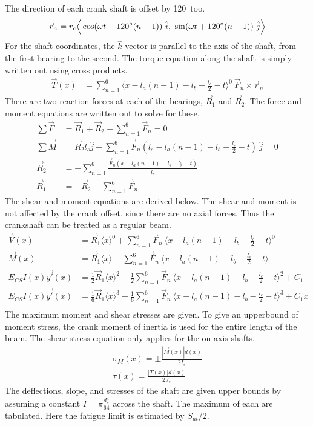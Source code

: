 \documentclass[10pt,a4paper]{article}
\begin{document}
The direction of each crank shaft is offset by 120\degree\ too.
\begin{align*}
	\vec{r}_n = r_c \Big \langle \cos (\omega t + 120 \degree (n-1)  )\ \hat{i},\ \sin (\omega t + 120 \degree (n-1))\ \hat{j}  \Big \rangle
\end{align*}
For the shaft coordinates, the $\hat{k}$ vector is parallel to the axis of the shaft, from the first bearing to the second. The torque equation along the shaft is simply written out using cross products.
\begin{align*}
	\vec{T}(x) &= \sum_{n=1}^6 \langle x - l_a (n-1) - l_b - \frac{l_c}{2} - t\rangle^0\ \vec{F}_n \times \vec{r}_n 
\end{align*}
There are two reaction forces at each of the bearings, $\vec{R}_1$ and $\vec{R}_2$. The force and moment equations are written out to solve for these.
\begin{align*}
	\sum \vec{F} &= \vec{R}_1 + \vec{R}_2 + \sum_{n=1}^6 \vec{F}_n = 0 \\
	\sum \vec{M} &= \vec{R}_2 l_s \hat{j} + \sum_{n=1}^6 \vec{F}_n  ( l_s - l_a (n-1) - l_b - \frac{l_c}{2} - t)\ \hat{j} = 0\\
	\vec{R}_2 &= - \sum_{n=1}^6 \frac{\vec{F}_n ( x - l_a (n-1) - l_b - \frac{l_c}{2} - t)}{l_s}\\
	\vec{R}_1 &= -\vec{R}_2 - \sum_{n=1}^6 \vec{F}_n
\end{align*}
The shear and moment equations are derived below. The shear and moment is not affected by the crank offset, since there are no axial forces. Thus the crankshaft can be treated as a regular beam.
\begin{align*}
	\vec{V}(x) &= \vec{R}_1 \langle x \rangle^0 + \sum_{n=1}^6 \vec{F}_n\ \langle x - l_a (n-1) - l_b - \frac{l_c}{2} - t\rangle^0\\
	\vec{M}(x) &= \vec{R}_1 \langle x \rangle + \sum_{n=1}^6 \vec{F}_n\ \langle x - l_a (n-1) - l_b - \frac{l_c}{2} - t\rangle\\
	E_{CS} I (x) \vec{y'}(x) &= \frac{1}{2}\vec{R}_1 \langle x \rangle^2 + \frac{1}{2}\sum_{n=1}^6 \vec{F}_n\ \langle x - l_a (n-1) - l_b - \frac{l_c}{2} - t\rangle^2 + C_1\\
	E_{CS} I (x) \vec{y'}(x) &= \frac{1}{6}\vec{R}_1 \langle x \rangle^3 + \frac{1}{6}\sum_{n=1}^6 \vec{F}_n\ \langle x - l_a (n-1) - l_b - \frac{l_c}{2} - t\rangle^3 + C_1 x\\
\end{align*}
The maximum moment and shear stresses are given. To give an upperbound of moment stress, the crank moment of inertia is used for the entire length of the beam. The shear stress equation only applies for the on axis shafts.
\begin{align*}
	\sigma_M (x) = \pm \frac{|\vec{M}(x)| d(x)}{2 I_s}\\
	\tau (x) = \frac{|T(x)| d (x)}{2 J_s}
\end{align*}
The deflections, slope, and stresses of the shaft are given upper bounds by assuming a constant $I = \pi \frac{d_s^4}{64}$ across the shaft.
The maximum of each are tabulated. Here the fatigue limit is estimated by $S_{ut}/2$.
\end{document}
